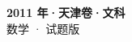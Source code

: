 \documentclass[zihao=-4, a4paper]{ctexart}
\begin{document}
\begin{center}
  {\Large\bfseries 2011 年·天津卷·文科}\\[4pt]
  {\large 数学 · 试题版}
\end{center}
\medskip
{}

\end{document}
